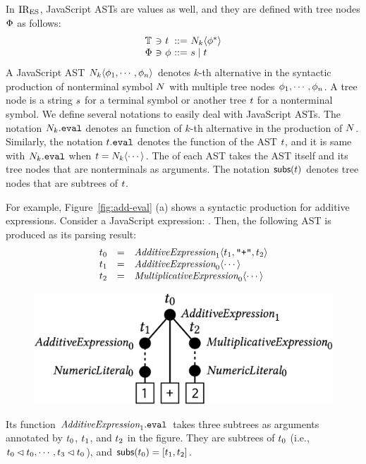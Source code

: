In $\text{IR}_\text{ES}$, JavaScript ASTs are values as well, and they are defined with tree
nodes $\Phi$ as follows:
\[
  \begin{array}{l@{~}c@{~}l@{~}c@{~}l}
    \treeset &\ni& \tree &::=& \nt_k \langle \node^* \rangle\\
    \nodeset &\ni& \node &::=& \str \mid \tree\\
  \end{array}
\]
A JavaScript AST $N_k \langle \phi_1, \cdots, \phi_n \rangle$ denotes $k$-th
alternative in the syntactic production of nonterminal symbol $N$ with
multiple tree nodes $\phi_1, \cdots, \phi_n$.  A tree node is a string $s$
for a terminal symbol or another tree $t$ for a nonterminal symbol. We
define several notations to easily deal with JavaScript ASTs.  The notation
$\nt_k.\eval$ denotes an  function of $k$-th alternative in
the production of $N$.  Similarly, the notation $\tree.\eval$ denotes the
 function of the AST $t$, and it is same with
$\nt_k.\eval$ when $t = N_k \langle \cdots \rangle$. The
 of each AST takes the AST itself and its tree nodes that are
nonterminals as arguments.  The notation $\getsubs(\tree)$ denotes tree nodes
that are subtrees of $t$.

For example, Figure~\ref{fig:add-eval} (a) shows a syntactic production for
additive expressions.  Consider a JavaScript expression: .  Then,
the following AST is produced as its parsing result:
\[
  \begin{array}{lcl}
    \tree_0 &=&
    \essyn{AdditiveExpression}_1 \langle \tree_1, \code{"+"}, \tree_2 \rangle\\

    \tree_1 &=&
    \essyn{AdditiveExpression}_0 \langle \cdots \rangle\\

    \tree_2 &=&
    \essyn{MultiplicativeExpression}_0 \langle \cdots \rangle\\
  \end{array}
\]
\begin{figure}[H]
  \vspace*{-1em}
  \includegraphics[width=.7\columnwidth]{img/add-ast.png}
  \vspace*{-1em}
\end{figure}
\noindent Its  function $\essyn{AdditiveExpression}_1.\eval$
takes three subtrees as arguments annotated by $t_0$, $t_1$, and
$t_2$ in the figure. They are subtrees of $t_0$ (i.e., $t_0 \lhd
t_0, \cdots, t_3 \lhd t_0$), and $\getsubs(\tree_0) = [\tree_1,
\tree_2]$.

